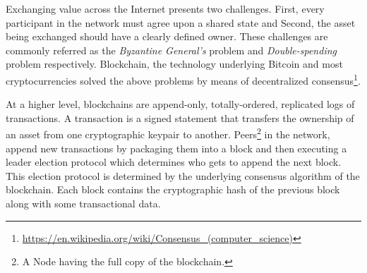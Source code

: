 	Exchanging value across the Internet presents two challenges. First, every participant in the network must agree upon a shared state and Second, the asset being exchanged should have a clearly defined owner. These challenges are commonly referred as the \textit{Byzantine General's} problem\cite{lamport1982byzantine} and \textit{Double-spending} problem\cite{chohan2017double} respectively. Blockchain, the technology underlying Bitcoin and most cryptocurrencies solved the above problems by means of decentralized consensus\footnote{\url{https://en.wikipedia.org/wiki/Consensus_(computer_science)}}.
	
	At a higher level, blockchains are append-only, totally-ordered, replicated logs of transactions\cite{bonneau2015research}. A transaction is a signed statement that transfers the ownership of an asset from one cryptographic keypair to another. Peers\footnote{A Node having the full copy of the blockchain.} in the network, append new transactions by packaging them into a block and then executing a leader election protocol which determines who gets to append the next block\cite{nelson2016extending}. This election protocol is determined by the underlying consensus algorithm of the blockchain. Each block contains the cryptographic hash of the previous block along with some transactional data.